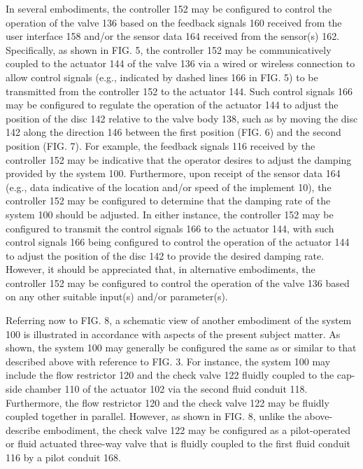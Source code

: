\documentclass[11pt,a4paper]{article}
\begin{document}
In several embodiments, the controller 152 may be configured to control the operation of the valve 136 based on the feedback signals 160 received from the user interface 158 and/or the sensor data 164 received from the sensor(s) 162. Specifically, as shown in FIG. 5, the controller 152 may be communicatively coupled to the actuator 144 of the valve 136 via a wired or wireless connection to allow control signals (e.g., indicated by dashed lines 166 in FIG. 5) to be transmitted from the controller 152 to the actuator 144. Such control signals 166 may be configured to regulate the operation of the actuator 144 to adjust the position of the disc 142 relative to the valve body 138, such as by moving the disc 142 along the direction 146 between the first position (FIG. 6) and the second position (FIG. 7). For example, the feedback signals 116 received by the controller 152 may be indicative that the operator desires to adjust the damping provided by the system 100. Furthermore, upon receipt of the sensor data 164 (e.g., data indicative of the location and/or speed of the implement 10), the controller 152 may be configured to determine that the damping rate of the system 100 should be adjusted. In either instance, the controller 152 may be configured to transmit the control signals 166 to the actuator 144, with such control signals 166 being configured to control the operation of the actuator 144 to adjust the position of the disc 142 to provide the desired damping rate. However, it should be appreciated that, in alternative embodiments, the controller 152 may be configured to control the operation of the valve 136 based on any other suitable input(s) and/or parameter(s).

Referring now to FIG. 8, a schematic view of another embodiment of the system 100 is illustrated in accordance with aspects of the present subject matter. As shown, the system 100 may generally be configured the same as or similar to that described above with reference to FIG. 3. For instance, the system 100 may include the flow restrictor 120 and the check valve 122 fluidly coupled to the cap-side chamber 110 of the actuator 102 via the second fluid conduit 118. Furthermore, the flow restrictor 120 and the check valve 122 may be fluidly coupled together in parallel. However, as shown in FIG. 8, unlike the above-describe embodiment, the check valve 122 may be configured as a pilot-operated or fluid actuated three-way valve that is fluidly coupled to the first fluid conduit 116 by a pilot conduit 168.
\end{document}
